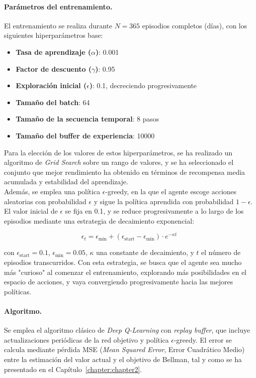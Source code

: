 \paragraph{Parámetros del entrenamiento.}  
El entrenamiento se realiza durante \(N = 365\) episodios completos (días), con los siguientes 
hiperparámetros base:
\begin{itemize}
    \item \textbf{Tasa de aprendizaje (\(\alpha\))}: 0.001
    \item \textbf{Factor de descuento (\(\gamma\))}: 0.95
    \item \textbf{Exploración inicial (\(\epsilon\))}: 0.1, decreciendo progresivamente
    \item \textbf{Tamaño del batch}: 64
    \item \textbf{Tamaño de la secuencia temporal}: 8 pasos
    \item \textbf{Tamaño del buffer de experiencia}: 10000
\end{itemize}

Para la elección de los valores de estos hiperparámetros, se ha realizado un algoritmo de 
\textit{Grid Search} sobre un rango de valores, y se ha seleccionado el conjunto que mejor 
rendimiento ha obtenido en términos de recompensa media acumulada y estabilidad del aprendizaje.\\

Además, se emplea una política \(\epsilon\)-greedy, en la que el agente escoge acciones aleatorias 
con probabilidad \(\epsilon\) y sigue la política aprendida con probabilidad  \(1 - \epsilon\). El 
valor inicial de \(\epsilon\) se fija en 0.1, y se reduce progresivamente a lo largo de los 
episodios mediante una estrategia de decaimiento exponencial:

\begin{equation}
    \epsilon_t = \epsilon_{\text{min}} + (\epsilon_{\text{start}} - \epsilon_{\text{min}}) \cdot 
    e^{-\kappa t}
\end{equation}

con \(\epsilon_{\text{start}} = 0.1\), \(\epsilon_{\text{min}} = 0.05\), \(\kappa\)  una 
constante de decaimiento, y \(t\) el número de episodios transcurridos. Con esta estrategia, se 
busca que el agente sea mucho más "curioso" al comenzar el entrenamiento, explorando más 
posibilidades en el espacio de acciones, y vaya convergiendo progresivamente hacia las mejores 
políticas.

\paragraph{Algoritmo.}  
Se emplea el algoritmo clásico de \textit{Deep Q-Learning} con \textit{replay buffer}, que incluye 
actualizaciones periódicas de la red objetivo y política \(\epsilon\)-greedy. El error se calcula 
mediante pérdida MSE (\textit{Mean Squared Error}, Error Cuadrático Medio) entre la estimación del 
valor actual y el objetivo de Bellman, tal y como se ha presentado en el Capítulo~\ref{chapter:chapter2}.

